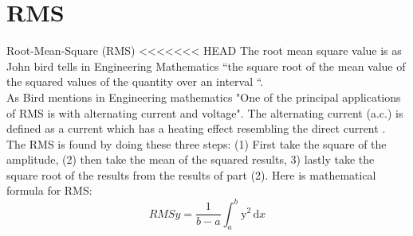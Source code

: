 \section{RMS}
Root-Mean-Square (RMS)
<<<<<<< HEAD
The root mean square value is as John bird tells in Engineering Mathematics \citep{Bird2007} “the square root of the mean value of the squared values of the quantity over an interval “.
\\
As Bird mentions in Engineering mathematics "One of the principal applications of RMS is with alternating current and voltage". \citep{Bird2007} The alternating current (a.c.) is defined as a current which has a heating effect resembling the direct current \citep{Bird2007}.
\\
The RMS is found by doing these three steps:
(1) First take the square of the amplitude, (2) then take the mean of the squared results, 3) lastly take the square root of the results from the results of part (2)\citep{Bird2007}. Here is \cite{Bird2007} mathematical formula for RMS:
\begin{equation}\label{eq:RMS formular}
RMSy = \frac{1}{b-a}\int_a^b\mathrm{y}^{2}\,\mathrm{d}x
\end{equation}
